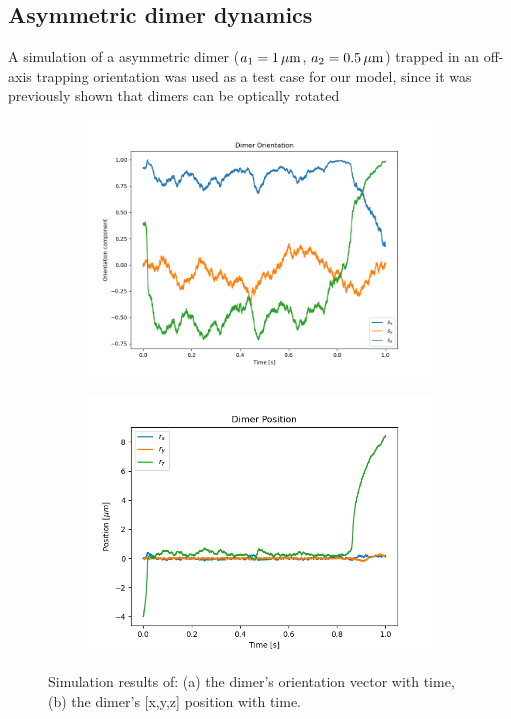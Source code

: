 \subsection{Asymmetric dimer dynamics}
\label{sec:motion}
A simulation of a asymmetric dimer ($a_1=1\,\mu{\rm m}$, $a_2=0.5\,\mu{\rm m}$) 
trapped in an off-axis trapping orientation was used as a test case for our 
model, since it was previously shown that dimers can be optically rotated 

\begin{figure}[h!]
	\centering
	\begin{subfigure}{0.45\textwidth}
		\subcaption{}
		\includegraphics[width =\textwidth]{fig7a.png}
	\end{subfigure}
	\begin{subfigure}{0.45\textwidth}
		\subcaption{}
		\includegraphics[width=\textwidth]{fig7b.png}
	\end{subfigure}
	\caption{Simulation results of: (a) the dimer's orientation vector with time, (b) the dimer's [x,y,z] position with time.}
	\label{fig:motion}
\end{figure}

